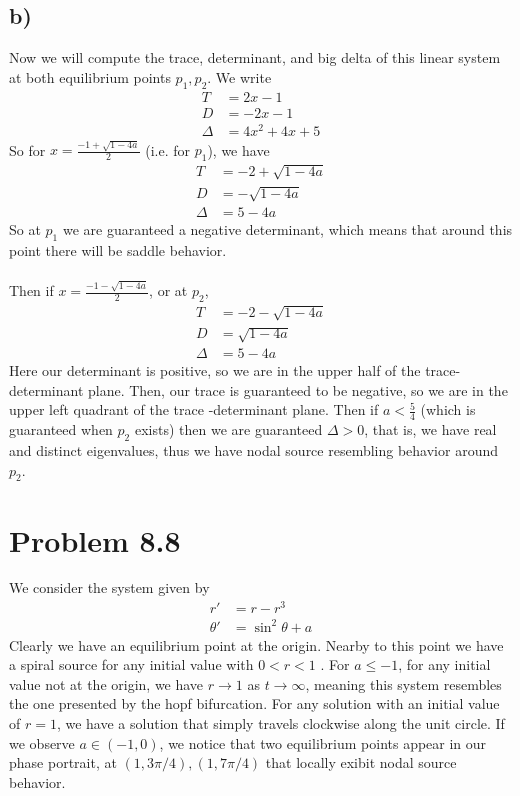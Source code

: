 \documentclass{article}
\theoremstyle{definition}
\begin{document}
\subsection*{b)}
Now we will compute the trace, determinant, and big delta of this linear system at both
equilibrium points $p_1, p_2$. We write
\begin{align*}
    T&=2x-1\\D&=-2x-1\\ \Delta&=4x^2 + 4x + 5
\end{align*}
So for $x = \frac{-1+\sqrt{1-4a}}{2}$ (i.e. for $p_1$), we have
\begin{align*}
    T&=-2+\sqrt{1-4a}\\
    D&=-\sqrt{1-4a}\\
    \Delta&=5-4a
\end{align*}
So at $p_1$ we are guaranteed a negative determinant, which means that around this point
there will be saddle behavior.\\\\
Then if $x = \frac{-1-\sqrt{1-4a}}{2}$, or at $p_2$,
\begin{align*}
    T&=-2-\sqrt{1-4a}\\
    D&=\sqrt{1-4a}\\
    \Delta&=5-4a
\end{align*}
Here our determinant is positive, so we are in the upper half of the trace-determinant plane.
Then, our trace is guaranteed to be negative, so we are in the upper left quadrant of the trace
-determinant plane. Then if $a < \frac{5}{4}$ (which is guaranteed when $p_2$ exists) then we are guaranteed $\Delta > 0$, that is, we have 
real and distinct eigenvalues, thus we have nodal source resembling behavior around $p_2$.
\section*{Problem 8.8}
We consider the system given by
\begin{align*}
    r'&=r-r^3\\
    \theta'&=\sin^2\theta + a
\end{align*}
Clearly we have an equilibrium point at the origin.
Nearby to this point we have a spiral source for any initial value with $0 < r < 1$
. For $a \leqslant -1$, for any initial value not at the origin, we have $r \rightarrow 1$ as $t \rightarrow \infty$, meaning this 
system resembles the one presented by the hopf bifurcation. For any solution with an initial value 
of $r = 1$, we have a solution that simply travels clockwise along the unit circle. If we observe $a \in (-1,0)$,
we notice that two equilibrium points appear in our phase portrait, at $(1, 3\pi /4), (1, 7\pi / 4)$ that 
locally exibit nodal source behavior.
\end{document}
